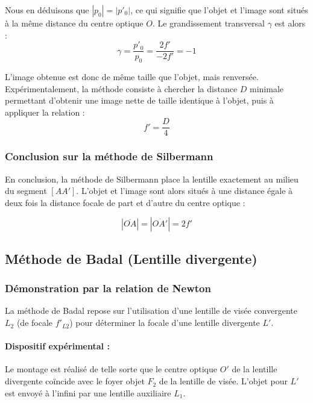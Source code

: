 Nous en déduisons que $|p_{0}| = |p'_{0}|$, 
ce qui signifie que l'objet et l'image 
sont situés à la même distance du centre optique $O$. 
Le grandissement transversal $\gamma$ est alors :
\begin{equation}
    \gamma = \frac{p'_{0}}{p_{0}} = \frac{2f'}{-2f'} = -1
\end{equation}

L'image obtenue est donc de même taille que l'objet, 
mais renversée. 
Expérimentalement, la méthode consiste à chercher 
la distance $D$ minimale permettant d'obtenir 
une image nette de taille identique à l'objet, 
puis à appliquer la relation :
\begin{equation}
    f' = \frac{D}{4}
\end{equation}

\subsubsection{Conclusion sur la méthode de Silbermann}

En conclusion, la méthode de Silbermann place la lentille 
exactement au milieu du segment $[AA']$. 
L'objet et l'image sont alors situés 
à une distance égale à deux fois la distance focale 
de part et d'autre du centre optique :

\begin{equation}
    |\overline{OA}| = |\overline{OA'}| = 2f'
\end{equation}

\subsection{Méthode de Badal (Lentille divergente)}

\subsubsection{Démonstration par la relation de Newton}

La méthode de Badal repose sur l'utilisation d'une lentille de visée convergente $L_2$ (de focale $f'_{L2}$) pour déterminer la focale d'une lentille divergente $L'$. 

\paragraph{Dispositif expérimental :}
Le montage est réalisé de telle sorte que le centre optique $O'$ de la lentille divergente coïncide avec le foyer objet $F_2$ de la lentille de visée. L'objet pour $L'$ est envoyé à l'infini par une lentille auxiliaire $L_1$.

